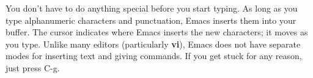 \documentclass[12pt]{book}
\begin{document}
You don't have to do anything special before you start typing. As long as you type alphanumeric characters and punctuation, Emacs inserts them into your buffer. The cursor indicates where Emacs inserts the new characters; it moves as you type. Unlike many editors (particularly \textbf{vi}), Emacs does not have separate modes for inserting text and giving commands. If you get stuck for any reason, just press $\mathrm{C}$-g.
\end{document}
